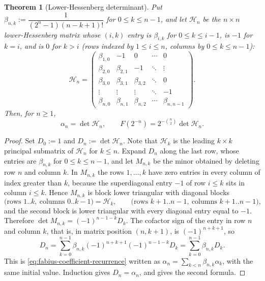 \documentclass[11pt,a4paper,oneside,openany]{book}
\newtheorem{theorem}{Theorem}[chapter]
\theoremstyle{definition}
\theoremstyle{remark}
\begin{document}
\begin{theorem}[Lower-Hessenberg determinant]\label{thm:fabius-hessenberg}
Put $\beta_{n,k}:=\dfrac1{(2^n-1)(n-k+1)!}$ for $0\le k\le n-1$, and let
$\mathcal H_n$ be the $n\times n$ lower-Hessenberg matrix whose $(i,k)$ entry is
$\beta_{i,k}$ for $0\le k\le i-1$, is $-1$ for $k=i$, and is $0$ for $k>i$
(rows indexed by $1\le i\le n$, columns by $0\le k\le n-1$):
\begin{equation}\label{eq:fabius-hessenberg-matrix}
 \mathcal H_n=
 \begin{pmatrix}
 \beta_{1,0}&-1&0&\cdots&0\\
 \beta_{2,0}&\beta_{2,1}&-1&\ddots&\vdots\\
 \beta_{3,0}&\beta_{3,1}&\beta_{3,2}&\ddots&0\\
 \vdots&\vdots&\vdots&\ddots&-1\\
 \beta_{n,0}&\beta_{n,1}&\beta_{n,2}&\cdots&\beta_{n,n-1}
 \end{pmatrix}.
\end{equation}
Then, for $n\ge1$,
\begin{equation}\label{eq:fabius-hessenberg}
 \alpha_n=\det\mathcal H_n,
 \qquad
 F(2^{-n})=2^{-\binom n2}\det\mathcal H_n .
\end{equation}
\end{theorem}

\begin{proof}
Set $D_0:=1$ and $D_n:=\det\mathcal H_n$.  Note that $\mathcal H_k$ is the leading
$k\times k$ principal submatrix of $\mathcal H_n$ for $k\le n$.  Expand $D_n$ along the
last row, whose entries are $\beta_{n,k}$ for $0\le k\le n-1$, and let $M_{n,k}$ be the
minor obtained by deleting row $n$ and column $k$.  In $M_{n,k}$ the rows $1,\ldots,k$
have zero entries in every column of index greater than $k$, because the superdiagonal
entry $-1$ of row $i\le k$ sits in column $i\le k$.  Hence $M_{n,k}$ is block lower
triangular with diagonal blocks
\[
 \bigl(\text{rows }1..k,\ \text{columns }0..k-1\bigr)=\mathcal H_k,
 \qquad
 \bigl(\text{rows }k{+}1..n{-}1,\ \text{columns }k{+}1..n{-}1\bigr),
\]
and the second block is lower triangular with every diagonal entry equal to $-1$.
Therefore $\det M_{n,k}=(-1)^{n-1-k}D_k$.  The cofactor sign of the entry in row $n$ and
column $k$, that is, in matrix position $(n,k+1)$, is $(-1)^{n+k+1}$, so
\[
 D_n=\sum_{k=0}^{n-1}\beta_{n,k}(-1)^{n+k+1}(-1)^{n-1-k}D_k
 =\sum_{k=0}^{n-1}\beta_{n,k}D_k .
\]
This is \eqref{eq:fabius-coefficient-recurrence} written as
$\alpha_n=\sum_{k<n}\beta_{n,k}\alpha_k$, with the same initial value.  Induction gives
$D_n=\alpha_n$, and  gives the second formula.
\end{proof}
\end{document}
